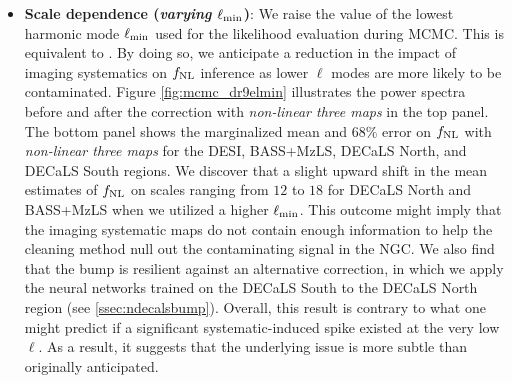 \begin{itemize}[itemindent=*]
\item \textbf{Scale dependence (\textit{varying $\ell_{\rm min}$})}: We raise the value of the lowest harmonic mode $\ell_{\rm min}$ used for the likelihood evaluation during MCMC. This is equivalent to . By doing so, we anticipate a reduction in the impact of imaging systematics on $f_{\rm NL}$ inference as lower $\ell$ modes are more likely to be contaminated. Figure \ref{fig:mcmc_dr9elmin} illustrates the power spectra before and after the correction with \textit{non-linear three maps} in the top panel. The bottom panel shows the marginalized mean and $68\%$ error on $f_{\rm NL}$ with \textit{non-linear three maps} for the DESI, BASS+MzLS, DECaLS North, and DECaLS South regions. We discover that a slight upward shift in the mean estimates of $f_{\rm NL}$ on scales ranging from $12$ to $18$ for DECaLS North and BASS+MzLS when we utilized a higher $\ell_{\rm min}$. This outcome might imply that the imaging systematic maps do not contain enough information to help the cleaning method null out the contaminating signal in the NGC. We also find that the bump is resilient against an alternative correction, in which we apply the neural networks trained on the DECaLS South to the DECaLS North region (see \ref{ssec:ndecalsbump}). Overall, this result is contrary to what one might predict if a significant systematic-induced spike existed at the very low $\ell$. As a result, it suggests that the underlying issue is more subtle than originally anticipated.
\end{itemize}

